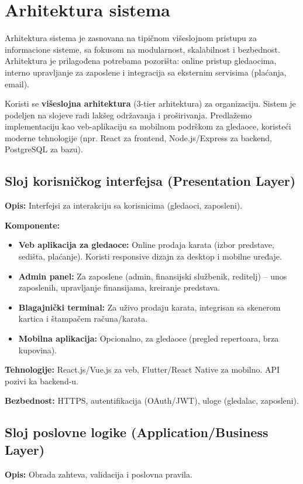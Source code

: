 \section{Arhitektura sistema}

Arhitektura sistema je zasnovana na tipičnom višeslojnom pristupu za informacione sisteme, sa fokusom na modularnost, skalabilnost i bezbednost. Arhitektura je prilagođena potrebama pozorišta: online pristup gledaocima, interno upravljanje za zaposlene i integracija sa eksternim servisima (plaćanja, email).

Koristi se \textbf{višeslojna arhitektura} (3-tier arhitektura) za organizaciju. Sistem je podeljen na slojeve radi lakšeg održavanja i proširivanja. Predlažemo implementaciju kao veb-aplikaciju sa mobilnom podrškom za gledaoce, koristeći moderne tehnologije (npr. React za frontend, Node.js/Express za backend, PostgreSQL za bazu).

\subsection{Sloj korisničkog interfejsa (Presentation Layer)}
\textbf{Opis:} Interfejsi za interakciju sa korisnicima (gledaoci, zaposleni).

\textbf{Komponente:}
\begin{itemize}
    \item \textbf{Veb aplikacija za gledaoce:} Online prodaja karata (izbor predstave, sedišta, plaćanje). Koristi responsive dizajn za desktop i mobilne uređaje.
    \item \textbf{Admin panel:} Za zaposlene (admin, finansijski službenik, reditelj) – unos zaposlenih, upravljanje finansijama, kreiranje predstava.
    \item \textbf{Blagajnički terminal:} Za uživo prodaju karata, integrisan sa skenerom kartica i štampačem računa/karata.
    \item \textbf{Mobilna aplikacija:} Opcionalno, za gledaoce (pregled repertoara, brza kupovina).
\end{itemize}

\textbf{Tehnologije:} React.js/Vue.js za veb, Flutter/React Native za mobilno. API pozivi ka backend-u.

\textbf{Bezbednost:} HTTPS, autentifikacija (OAuth/JWT), uloge (gledalac, zaposleni).

\subsection{Sloj poslovne logike (Application/Business Layer)}
\textbf{Opis:} Obrada zahteva, validacija i poslovna pravila.

